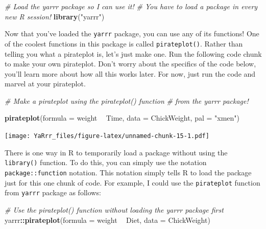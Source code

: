 \documentclass[]{book}
\newenvironment{Shaded}{\begin{snugshade}}{\end{snugshade}}
\newcommand{\KeywordTok}[1]{\textcolor[rgb]{0.13,0.29,0.53}{\textbf{#1}}}
\newcommand{\DataTypeTok}[1]{\textcolor[rgb]{0.13,0.29,0.53}{#1}}
\newcommand{\StringTok}[1]{\textcolor[rgb]{0.31,0.60,0.02}{#1}}
\newcommand{\CommentTok}[1]{\textcolor[rgb]{0.56,0.35,0.01}{\textit{#1}}}
\newcommand{\OperatorTok}[1]{\textcolor[rgb]{0.81,0.36,0.00}{\textbf{#1}}}
\newcommand{\NormalTok}[1]{#1}
\theoremstyle{definition}
\theoremstyle{definition}
\theoremstyle{remark}
\begin{document}
\begin{Shaded}
\begin{Highlighting}[]
\CommentTok{# Load the yarrr package so I can use it!}
\CommentTok{#   You have to load a package in every new R session!}
\KeywordTok{library}\NormalTok{(}\StringTok{"yarrr"}\NormalTok{)}
\end{Highlighting}
\end{Shaded}

Now that you've loaded the \texttt{yarrr} package, you can use any of
its functions! One of the coolest functions in this package is called
\texttt{pirateplot()}. Rather than telling you what a pirateplot is,
let's just make one. Run the following code chunk to make your own
pirateplot. Don't worry about the specifics of the code below, you'll
learn more about how all this works later. For now, just run the code
and marvel at your pirateplot.

\begin{Shaded}
\begin{Highlighting}[]
\CommentTok{# Make a pirateplot using the pirateplot() function}
\CommentTok{#  from the yarrr package!}

\KeywordTok{pirateplot}\NormalTok{(}\DataTypeTok{formula =}\NormalTok{ weight }\OperatorTok{~}\StringTok{ }\NormalTok{Time, }
           \DataTypeTok{data =}\NormalTok{ ChickWeight,}
           \DataTypeTok{pal =} \StringTok{"xmen"}\NormalTok{)}
\end{Highlighting}
\end{Shaded}

\texttt{[image: YaRrr\_files/figure-latex/unnamed-chunk-15-1.pdf]}

There is one way in R to temporarily load a package without using the
\texttt{library()} function. To do this, you can simply use the notation
\texttt{package::function} notation. This notation simply tells R to
load the package just for this one chunk of code. For example, I could
use the \texttt{pirateplot} function from \texttt{yarrr} package as
follows:

\begin{Shaded}
\begin{Highlighting}[]
\CommentTok{# Use the pirateplot() function without loading the yarrr package first}
\NormalTok{yarrr}\OperatorTok{::}\KeywordTok{pirateplot}\NormalTok{(}\DataTypeTok{formula =}\NormalTok{ weight }\OperatorTok{~}\StringTok{ }\NormalTok{Diet,}
                  \DataTypeTok{data =}\NormalTok{ ChickWeight)}
\end{Highlighting}
\end{Shaded}
\end{document}
